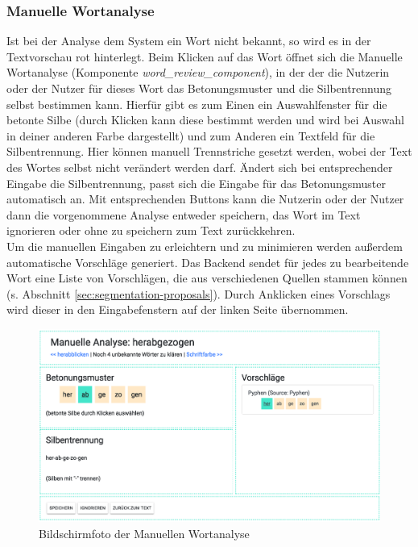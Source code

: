 \subsubsection{Manuelle Wortanalyse}
\label{sec:manuelleanalyse}

Ist bei der Analyse dem System ein Wort nicht bekannt, so wird es in der Textvorschau rot hinterlegt. Beim Klicken auf das Wort öffnet sich die Manuelle Wortanalyse (Komponente \textit{word\_review\_component}), in der der die Nutzerin oder der Nutzer für dieses Wort das Betonungsmuster und die Silbentrennung selbst bestimmen kann. Hierfür gibt es zum Einen ein Auswahlfenster für die betonte Silbe (durch Klicken kann diese bestimmt werden und wird bei Auswahl in deiner anderen Farbe dargestellt) und zum Anderen ein Textfeld für die Silbentrennung. Hier können manuell Trennstriche gesetzt werden, wobei der Text des Wortes selbst nicht verändert werden darf. Ändert sich bei entsprechender Eingabe die Silbentrennung, passt sich die Eingabe für das Betonungsmuster automatisch an. Mit entsprechenden Buttons kann die Nutzerin oder der Nutzer dann die vorgenommene Analyse entweder speichern, das Wort im Text ignorieren oder ohne zu speichern zum Text zurückkehren.\\

Um die manuellen Eingaben zu erleichtern und zu minimieren werden außerdem automatische Vorschläge generiert. Das Backend sendet für jedes zu bearbeitende Wort eine Liste von Vorschlägen, die aus verschiedenen Quellen stammen können (s. Abschnitt \ref{sec:segmentation-proposals}). Durch Anklicken eines Vorschlags wird dieser in den Eingabefenstern auf der linken Seite übernommen.


\begin{figure}[h!]
	\centering
	\includegraphics[width=.8\linewidth]{figures/frontend/manuelle-analyse}
	\caption{Bildschirmfoto der Manuellen Wortanalyse}
	\label{fig:frontend-manuelle-analyse}
\end{figure}

